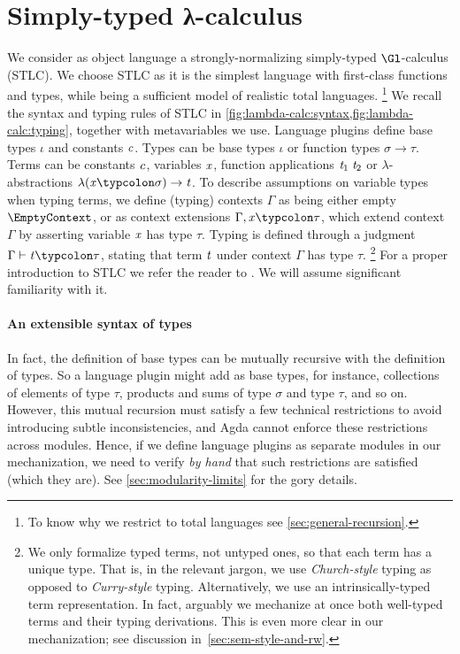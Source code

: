 \section{Simply-typed λ-calculus}
\label{sec:intro-stlc}

We consider as object language a strongly-normalizing
simply-typed $\Gl$-calculus (STLC). We choose STLC as it is the
simplest language with first-class functions and types, while
being a sufficient model of realistic total languages.%
\footnote{To know why we restrict to total languages see
  \cref{sec:general-recursion}.}
%
We recall the syntax and typing rules of STLC in
\cref{fig:lambda-calc:syntax,fig:lambda-calc:typing}, together
with metavariables we use. Language plugins define base types
\ensuremath{\iota} and constants \ensuremath{\Varid{c}}. Types can be base types \ensuremath{\iota} or
function types \ensuremath{\sigma\to \tau}. Terms can be constants \ensuremath{\Varid{c}},
variables \ensuremath{\Varid{x}}, function applications \ensuremath{\Varid{t}_{1}\;\Varid{t}_{2}} or
$\lambda$-abstractions \ensuremath{\lambda (\Varid{x}\typcolon\sigma)\to \Varid{t}}. To describe
assumptions on variable types when typing terms, we define (typing)
contexts \ensuremath{\Gamma} as being either empty \ensuremath{\EmptyContext}, or as context
extensions \ensuremath{\Gamma,\Varid{x}\typcolon\tau}, which extend context \ensuremath{\Gamma} by
asserting variable \ensuremath{\Varid{x}} has type \ensuremath{\tau}. Typing is defined through
a judgment \ensuremath{\Gamma\vdash\Varid{t}\typcolon\tau}, stating that term \ensuremath{\Varid{t}} under
context \ensuremath{\Gamma} has type \ensuremath{\tau}.%
%
\footnote{We only formalize typed terms, not untyped ones, so
  that each term has a unique type. That is, in the relevant
  jargon, we use \emph{Church-style} typing as opposed to
  \emph{Curry-style} typing.
  Alternatively, we use an
  intrinsically-typed term representation.
  In fact, arguably we mechanize at
  once both well-typed terms and their typing derivations. This
  is even more clear in our mechanization; see discussion
  in~\cref{sec:sem-style-and-rw}.}
%
For a proper introduction to STLC we refer the reader to
\citet[Ch.~9]{Pierce02TAPL}. We will assume significant
familiarity with it.



\paragraph{An extensible syntax of types}
In fact, the definition of base types can be mutually recursive
with the definition of types. So a language plugin might add as
base types, for instance, collections of elements of type \ensuremath{\tau},
products and sums of type \ensuremath{\sigma} and type \ensuremath{\tau}, and so on.
%
However, this mutual recursion must satisfy a few technical
restrictions to avoid introducing subtle inconsistencies, and
Agda cannot enforce these restrictions across modules. Hence, if
we define language plugins as separate modules in our
mechanization, we need to verify \emph{by hand} that such
restrictions are satisfied (which they are). See
\cref{sec:modularity-limits} for the gory details.


